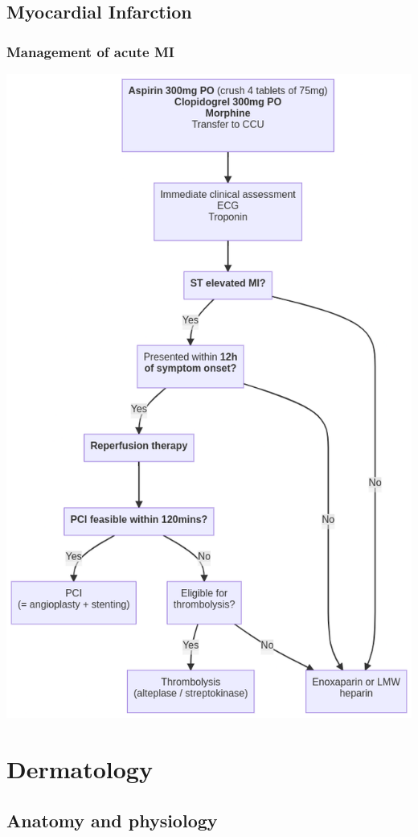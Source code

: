 \documentclass[
  12pt,
]{memoir}
\begin{document}
\pagebreak

\hypertarget{myocardial-infarction-1}{%
\section{Myocardial Infarction}\label{myocardial-infarction-1}}

\hypertarget{management-of-acute-mi}{%
\subsection{Management of acute MI}\label{management-of-acute-mi}}

\includegraphics[width=.7\textwidth]{../assets/med/MI-mx.png}

\pagebreak

\hypertarget{dermatology}{%
\chapter{Dermatology}\label{dermatology}}

\hypertarget{anatomy-and-physiology}{%
\section{Anatomy and physiology}\label{anatomy-and-physiology}}
\end{document}
